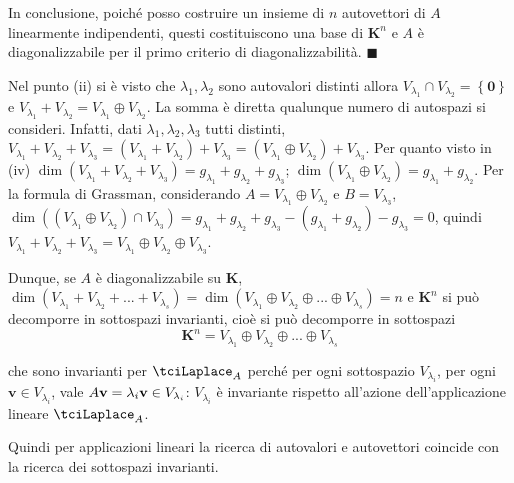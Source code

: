 \documentclass{article}
\begin{document}
In conclusione, poich\'{e} posso costruire un insieme di $n$ autovettori di $%
A$ linearmente indipendenti, questi costituiscono una base di $\mathbf{K}%
^{n} $ e $A$ \`{e} diagonalizzabile per il primo criterio di
diagonalizzabilit\`{a}. $\blacksquare $

Nel punto (ii) si \`{e} visto che $\lambda _{1},\lambda _{2}$ sono
autovalori distinti allora $V_{\lambda _{1}}\cap V_{\lambda _{2}}=\left\{ 
\mathbf{0}\right\} $ e $V_{\lambda _{1}}+V_{\lambda _{2}}=V_{\lambda
_{1}}\oplus V_{\lambda _{2}}$. La somma \`{e} diretta qualunque numero di
autospazi si consideri. Infatti, dati $\lambda _{1},\lambda _{2},\lambda
_{3} $ tutti distinti, $V_{\lambda _{1}}+V_{\lambda _{2}}+V_{\lambda
_{3}}=\left( V_{\lambda _{1}}+V_{\lambda _{2}}\right) +V_{\lambda
_{3}}=\left( V_{\lambda _{1}}\oplus V_{\lambda _{2}}\right) +V_{\lambda
_{3}} $. Per quanto visto in (iv) $\dim \left( V_{\lambda _{1}}+V_{\lambda
_{2}}+V_{\lambda _{3}}\right) =g_{\lambda _{1}}+g_{\lambda _{2}}+g_{\lambda
_{3}}$; $\dim \left( V_{\lambda _{1}}\oplus V_{\lambda _{2}}\right)
=g_{\lambda _{1}}+g_{\lambda _{2}}$. Per la formula di Grassman,
considerando $A=V_{\lambda _{1}}\oplus V_{\lambda _{2}}$ e $B=V_{\lambda
_{3}}$, $\dim \left( \left( V_{\lambda _{1}}\oplus V_{\lambda _{2}}\right)
\cap V_{\lambda _{3}}\right) =g_{\lambda _{1}}+g_{\lambda _{2}}+g_{\lambda
_{3}}-\left( g_{\lambda _{1}}+g_{\lambda _{2}}\right) -g_{\lambda _{3}}=0$,
quindi $V_{\lambda _{1}}+V_{\lambda _{2}}+V_{\lambda _{3}}=V_{\lambda
_{1}}\oplus V_{\lambda _{2}}\oplus V_{\lambda _{3}}$.

Dunque, se $A$ \`{e} diagonalizzabile su $\mathbf{K}$, $\dim \left(
V_{\lambda _{1}}+V_{\lambda _{2}}+...+V_{\lambda _{s}}\right) =\dim \left(
V_{\lambda _{1}}\oplus V_{\lambda _{2}}\oplus ...\oplus V_{\lambda
_{s}}\right) =n$ e $\mathbf{K}^{n}$ si pu\`{o} decomporre in sottospazi
invarianti, cio\`{e} si pu\`{o} decomporre in sottospazi%
\begin{equation*}
\mathbf{K}^{n}=V_{\lambda _{1}}\oplus V_{\lambda _{2}}\oplus ...\oplus
V_{\lambda _{s}}
\end{equation*}

che sono invarianti per $\tciLaplace _{A}$ perch\'{e} per ogni sottospazio $%
V_{\lambda _{i}}$, per ogni $\mathbf{v}\in V_{\lambda _{i}}$, vale $A\mathbf{%
v}=\lambda _{i}\mathbf{v}\in V_{\lambda _{i}}$: $V_{\lambda _{i}}$ \`{e}
invariante rispetto all'azione dell'applicazione lineare $\tciLaplace _{A}$.

Quindi per applicazioni lineari la ricerca di autovalori e autovettori
coincide con la ricerca dei sottospazi invarianti.
\end{document}
